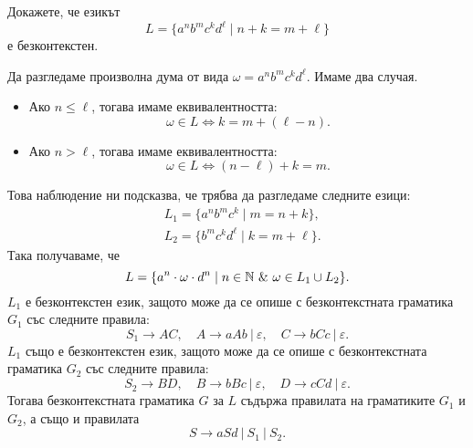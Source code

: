 \newpage
\begin{problem}
  Докажете, че езикът 
  \[L = \{a^nb^mc^kd^\ell \mid n+k = m + \ell\}\]
  е безконтекстен.
\end{problem}
\begin{hint}
  Да разгледаме произволна дума от вида $\omega = a^n b^m c^k d^\ell$.
  Имаме два случая.
  \begin{itemize}
  \item
    Ако $n \leq \ell$, тогава имаме еквивалентността:
    \[\omega \in L \iff k = m + (\ell- n).\]
  \item
    Ако $n > \ell$, тогава имаме еквивалентността:
    \[\omega \in L \iff (n-\ell) + k = m.\]
  \end{itemize}
  Това наблюдение ни подсказва, че трябва да разгледаме следните езици:
  \begin{align*}
    & L_1 = \{a^nb^mc^k \mid m = n+k\},\\
    & L_2 = \{b^mc^kd^\ell \mid k = m+\ell\}.
  \end{align*}
  Така получаваме, че
  \[L = \{a^n \cdot \omega \cdot d^n \mid n\in\Nat\ \&\ \omega \in L_1 \cup L_2\}.\]
  $L_1$ е безконтекстен език, защото може да се опише с безконтекстната граматика $G_1$ със следните правила:
  \[S_1 \to AC,\quad  A \to aAb\ |\ \varepsilon,\quad C \to bCc\ |\ \varepsilon.\]
  $L_1$ също е безконтекстен език, защото може да се опише с безконтекстната граматика $G_2$ със следните правила:
  \[S_2 \to BD,\quad B \to bBc\ |\ \varepsilon,\quad D \to cCd\ |\ \varepsilon.\]
  Тогава безконтекстната граматика $G$ за $L$ 
  съдържа правилата на граматиките $G_1$ и $G_2$, а също и правилата
  \[S \to aSd\ |\ S_1\ |\ S_2.\]
\end{hint}

